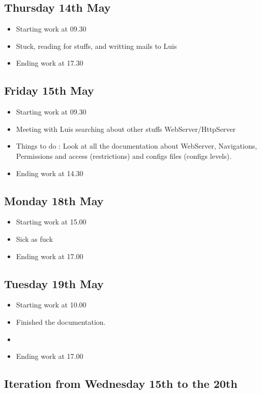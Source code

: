 \documentclass[a4paper, 10pt]{article}
\begin{document}
    \subsection*{Thursday 14th May}
\begin{itemize}
    \item Starting work at 09.30
    \item Stuck, reading for stuffs, and writting mails to Luis
    \item Ending work at 17.30
\end{itemize}

\subsection*{Friday 15th May}
\begin{itemize}
    \item Starting work at 09.30
    \item Meeting with Luis searching about other stuffs WebServer/HttpServer
    \item Things to do : Look at all the documentation about WebServer, Navigations, Permissions and access (restrictions) and configs files (configs levels).
    \item Ending work at 14.30
\end{itemize}

\subsection*{Monday 18th May}
\begin{itemize}
    \item Starting work at 15.00
    \item Sick as fuck
    \item Ending work at 17.00
\end{itemize}

\subsection*{Tuesday 19th May}
\begin{itemize}
    \item Starting work at 10.00
    \item Finished the documentation.
    \item 
    \item Ending work at 17.00
\end{itemize}

\subsection*{Iteration from Wednesday 15th to the 20th}
\end{document}
